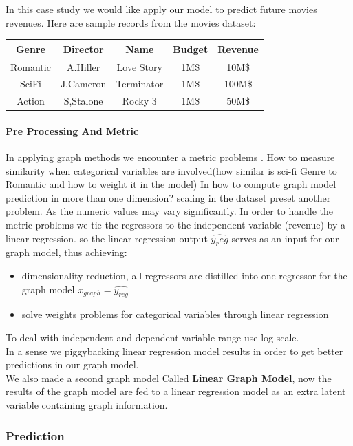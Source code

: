 \documentclass[a4paper]{article}
\begin{document}
In this case study we would like apply our model to predict future movies revenues.
Here are sample records from the movies dataset:\\

\renewcommand{\arraystretch}{1.2}
\begin{tabular}{c c c c | c}

Genre& Director&Name&Budget&Revenue\\
\hline
Romantic&A.Hiller&Love Story&1M\$&10M\$\\
SciFi&J,Cameron & Terminator &1M\$&100M\$\\
Action&S,Stalone&Rocky 3&1M\$&50M\$\\
\hline
\end{tabular}
\paragraph{Pre Processing And Metric}
In applying graph methods we encounter a metric problems .
How to measure similarity when categorical variables are involved(how similar  is  sci-fi Genre to Romantic and how to weight it in the model)
In how to compute graph model prediction in more than one dimension?
scaling in the dataset preset another problem.
As the numeric values may vary significantly.
In order to handle the metric problems
we tie the regressors to the independent variable (revenue) by a linear regression.
so the linear regression output $\hat{y_reg}$ serves as an input for our graph model, thus achieving:
\begin{itemize}
\item dimensionality reduction, all regressors
are distilled into one regressor for the graph model
$x_{graph}=\hat{y_{reg}}$
\item
 solve weights problems for categorical variables through linear regression
\end{itemize}
To deal with independent and dependent variable range
use log scale.\\
In a sense we piggybacking linear regression model 
results in order to get better predictions in our graph model.\\
We also made a second graph model Called \textbf{Linear Graph Model}, now the results of the graph model are fed to a linear regression model as an extra latent variable containing graph information.

\subsubsection{Prediction}
\end{document}
